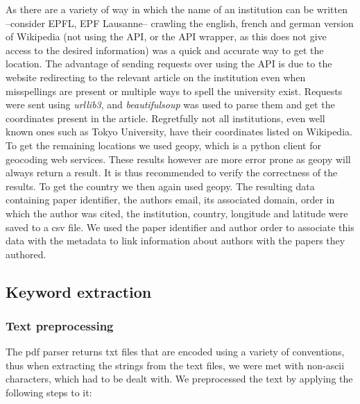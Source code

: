 \documentclass[article,twocolumn]{IEEEtran}
\begin{document}
As there are a variety of way in which the name of an institution can be
written --consider EPFL, EPF Lausanne-- crawling the english, french and
german version of Wikipedia (not using the API, or the API wrapper, as
this does not give access to the desired information) was a quick and
accurate way to get the location. The advantage of sending requests over
using the API is due to the website redirecting to the relevant article
on the institution even when misspellings are present or multiple ways
to spell the university exist. Requests were sent using \emph{urllib3},
and \emph{beautifulsoup} was used to parse them and get the coordinates
present in the article. Regretfully not all institutions, even well
known ones such as Tokyo University, have their coordinates listed on
Wikipedia. To get the remaining locations we used geopy, which is a
python client for geocoding web services. These results however are more
error prone as geopy will always return a result. It is thus recommended
to verify the correctness of the results. To get the country we then
again used geopy. The resulting data containing paper identifier, the
authors email, its associated domain, order in which the author was
cited, the institution, country, longitude and latitude were saved to a
csv file. We used the paper identifier and author order to associate
this data with the metadata to link information about authors with the
papers they authored.

    \hypertarget{keyword-extraction}{%
\subsection{Keyword extraction}\label{keyword-extraction}}

    \hypertarget{text-preprocessing}{%
\subsubsection{Text preprocessing}\label{text-preprocessing}}

    The pdf parser returns txt files that are encoded using a variety of
conventions, thus when extracting the strings from the text files, we
were met with non-ascii characters, which had to be dealt with. We
preprocessed the text by applying the following steps to it:
\end{document}
